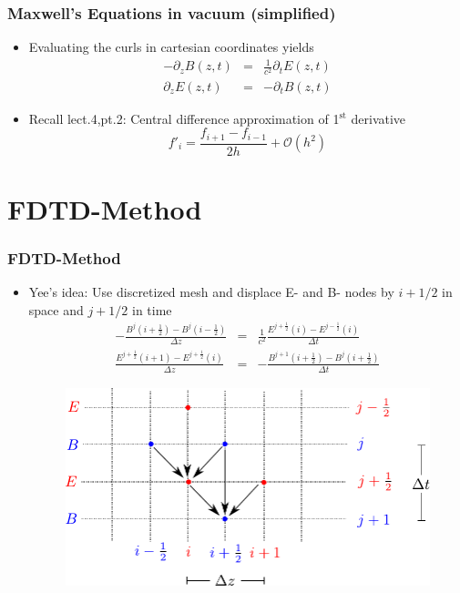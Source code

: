 \documentclass[ignorenonframetext]{beamer}
\begin{document}
\begin{frame}
\frametitle{Maxwell's Equations in vacuum (simplified)}
\begin{itemize}
\item Evaluating the curls in cartesian coordinates yields
\begin{eqnarray}
-\partial_z B(z, t) &=& \frac{1}{c^2} \partial_t E(z, t)\nonumber\\
\partial_z E(z, t)  &=& -\partial_t B(z, t)
\label{eq:maxwell_simplified}
\end{eqnarray}
\item Recall lect.4,pt.2: Central difference approximation of 1$^{\mathrm{st}}$ derivative
\begin{equation}
f'_i = \frac{f_{i+1} - f_{i-1}}{2h} + \mathcal{O}(h^2) 
\end{equation}
\end{itemize}
\end{frame}

\section{FDTD-Method}
\begin{frame}
\frametitle{FDTD-Method}
\begin{itemize}
\item Yee's idea: Use discretized mesh and displace E- and B- nodes by $i + 1/2$ in space and $j + 1/2$ in time 
\begin{eqnarray}
- \frac{B^{j}(i+\frac{1}{2}) - B^{j}(i-\frac{1}{2})}{\Delta z} &=& \frac{1}{c^2} \frac{E^{j+\frac{1}{2}}(i) - E^{j-\frac{1}{2}}(i)}{\Delta t}\nonumber\\
\frac{E^{j+\frac{1}{2}}(i + 1) - E^{j+\frac{1}{2}}(i)}{\Delta z} &=& -\frac{B^{j+1}(i+\frac{1}{2}) - B^{j}(i+\frac{1}{2})}{\Delta t} 
\end{eqnarray}
\begin{figure}
\centering
\includegraphics[width=0.7\linewidth]{yee_mesh}
\end{figure}

\end{itemize}
\end{frame}
\end{document}
